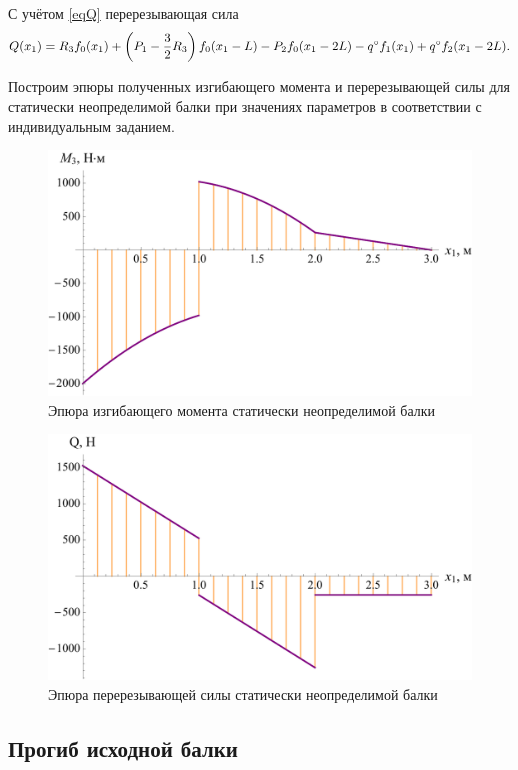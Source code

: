 \documentclass[12pt, a4paper]{article}
\begin{document}
	\vspace{-0.25em}
	
	С учётом \eqref{eqQ} перерезывающая сила
	\vspace{-0.25em}
	\begin{equation*}
		Q(x_1) =  R_3 f_0(x_1) + \left( P_1 - \dfrac{3}{2} R_3 \right) f_0(x_1 - L) - P_2 f_0(x_1 - 2L) - q^{\circ} f_1(x_1) + q^{\circ} f_2(x_1 - 2L). \\
	\end{equation*}
	
	Построим эпюры полученных изгибающего момента и перерезывающей силы для статически неопределимой балки при значениях параметров в соответствии с индивидуальным заданием.
	
	\newpage
	
	\begin{figure}[!h]
		\centering
		\includegraphics[width=0.75\linewidth]{plot-10}
		\caption{Эпюра изгибающего момента статически неопределимой балки}
	\end{figure} 
	
	\begin{figure}[!h]
		\centering
		\includegraphics[width=0.75\linewidth]{plot-11}
		\caption{Эпюра перерезывающей силы статически неопределимой балки}
	\end{figure}
	
	\subsection{Прогиб исходной балки}
	
\end{document}
